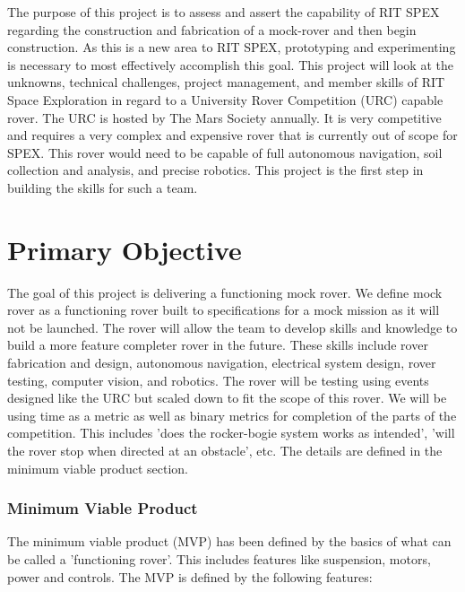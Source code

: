 \documentclass[conference]{IEEEtran} %
\begin{document}
The purpose of this project is to assess and assert the capability
of RIT SPEX regarding the construction and fabrication of a mock-rover and then begin construction. 
As this is a new area to RIT SPEX, prototyping and experimenting is necessary to most effectively accomplish this goal. 
This project will look at the unknowns, technical challenges, project management, and member skills of RIT Space Exploration in regard to a University Rover Competition (URC) capable rover. 
The URC is hosted by The Mars Society annually. 
It is very competitive and requires a very complex and expensive rover that is currently out of scope for SPEX. 
This rover would need to be capable of full autonomous navigation, soil collection and analysis, and precise robotics. 
This project is the first step in building the skills for such a team.


\section{Primary Objective}
\label{sec:primary-obj}

The goal of this project is delivering a functioning mock rover.
We define mock rover as a functioning rover built to specifications
for a mock mission as it will not be launched. The rover
will allow the team to develop skills and knowledge to build a
more feature completer rover in the future. These skills include
rover fabrication and design, autonomous navigation, electrical
system design, rover testing, computer vision, and robotics.
The rover will be testing using events designed like
the URC but scaled down to fit the scope of this rover. We
will be using time as a metric as well as binary metrics for
completion of the parts of the competition. This includes ’does
the rocker-bogie system works as intended’, ’will the rover stop
when directed at an obstacle’, etc. The details are defined in
the minimum viable product section.


\subsubsection{Minimum Viable Product}
\label{mvp}
  The minimum viable product (MVP) has been defined by the basics of what can be called a 'functioning rover'. This includes features like suspension, motors, power and controls. The MVP is defined by the following features: 
\end{document}
